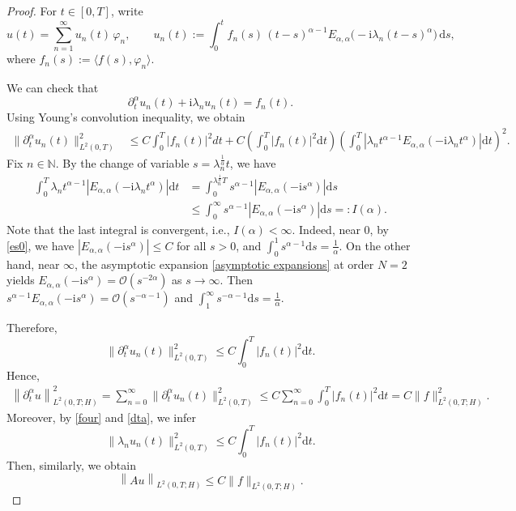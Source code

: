 \documentclass[reqno]{amsart}
\numberwithin{equation}{section}
\def \d {\mathrm{d}}
\begin{document}
\begin{proof}
For $t\in[0,T]$, write
\begin{equation}\label{eq:y-def}
u(t)=\sum_{n=1}^\infty u_n(t)\,\varphi_n,\qquad
u_n(t):=\int_0^t f_n(s)\,(t-s)^{\alpha-1}E_{\alpha,\alpha}\big(-\mathrm{i}\lambda_n (t-s)^\alpha\big)\,\d s,
\end{equation}
where $f_n(s):=\langle f(s),\varphi_n\rangle$.

We can check that
\begin{equation}\label{four}
\partial^{\alpha}_{t} u_n(t)+\mathrm{i}\lambda_n u_n(t)=f_n(t).
\end{equation}
Using Young's convolution inequality, we obtain
\begin{align}
\|\partial^{\alpha}_{t} u_n(t)\|^2_{L^2(0,T)} & \leq C \int_0^T\left|f_n(t)\right|^2 d t + C\left(\int_0^T\left|f_n(t)\right|^2 \d t\right)\left(\int_0^T\left|\lambda_n t^{\alpha-1} E_{\alpha, \alpha}\left(-\mathrm{i}\lambda_n t^\alpha\right)\right| \d t\right)^2.
\end{align}
Fix $n\in \mathbb N$. By the change of variable $s=\lambda_n^{\frac{1}{\alpha}} t$, we have
\begin{align*}
\int_0^T \lambda_n t^{\alpha-1} \left|E_{\alpha, \alpha}\left(-\mathrm{i}\lambda_n t^\alpha\right)\right| \d t &= \int_0^{\lambda_n^{\frac{1}{\alpha}}T} s^{\alpha-1} \left|E_{\alpha, \alpha}\left(-\mathrm{i}s^\alpha\right)\right| \d s\\
&\leq \int_0^{\infty} s^{\alpha-1}\left|E_{\alpha, \alpha}\left(-\mathrm{i}s^\alpha\right)\right| \d s =:I(\alpha).
\end{align*}
Note that the last integral is convergent, i.e., $I(\alpha)<\infty$. Indeed, near $0$, by \eqref{es0}, we have $\left|E_{\alpha, \alpha}\left(-\mathrm{i}s^\alpha\right)\right| \leq C$ for all $s>0$, and
$\displaystyle\int_0^{1} s^{\alpha-1} \d s=\frac{1}{\alpha}$. On the other hand, near $\infty$, the asymptotic expansion \eqref{asymptotic expansions} at order $N=2$ yields $E_{\alpha, \alpha}\left(-\mathrm{i}s^\alpha\right)=\mathcal{O}(s^{-2\alpha})$ as $s\to \infty$. Then $s^{\alpha-1} E_{\alpha, \alpha}\left(-\mathrm{i}s^\alpha\right)=\mathcal{O}(s^{-\alpha-1})$ and $\displaystyle\int_{1}^{\infty} s^{-\alpha-1} \d s=\frac{1}{\alpha}$.

Therefore, 
\begin{equation}\label{dta}
\|\partial^{\alpha}_{t} u_n(t)\|^2_{L^2(0,T)} \leq C \int_0^T\left|f_n(t)\right|^2 \d t.
\end{equation}
Hence,
\begin{align*}
\left\|\partial^{\alpha}_{t} u\right\|_{L^2(0,T;H)}^2 =\sum_{n=0}^{\infty} \|\partial^{\alpha}_{t} u_n(t)\|^2_{L^2(0,T)} \le C \sum_{n=0}^{\infty} \int_0^T |f_n(t)|^2 \d t = C \|f\|_{L^2(0,T;H)}^2.
\end{align*}
Moreover, by \eqref{four} and \eqref{dta}, we infer
$$\|\lambda_n u_n(t)\|^2_{L^2(0,T)} \leq C \int_0^T\left|f_n(t)\right|^2 \d t.$$
Then, similarly, we obtain
$$\left\|A u\right\|_{L^2(0,T;H)} \le C \|f\|_{L^2(0, T;H)}.$$
\end{proof}
\end{document}
